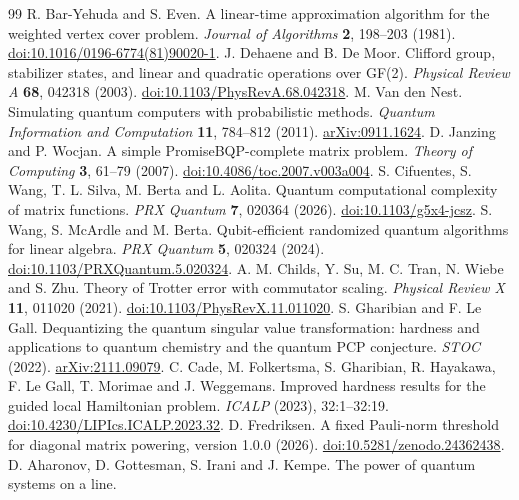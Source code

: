 \documentclass[11pt]{article}
\begin{document}
\begin{thebibliography}{99}
 R. Bar-Yehuda and S. Even. A linear-time approximation algorithm for the weighted vertex cover problem.
\emph{Journal of Algorithms} \textbf{2}, 198--203 (1981). \href{https://doi.org/10.1016/0196-6774(81)90020-1}{doi:10.1016/0196-6774(81)90020-1}.
 J. Dehaene and B. De Moor. Clifford group, stabilizer states, and linear and quadratic operations over GF(2).
\emph{Physical Review A} \textbf{68}, 042318 (2003). \href{https://doi.org/10.1103/PhysRevA.68.042318}{doi:10.1103/PhysRevA.68.042318}.
 M. Van den Nest. Simulating quantum computers with probabilistic methods.
\emph{Quantum Information and Computation} \textbf{11}, 784--812 (2011). \href{https://arxiv.org/abs/0911.1624}{arXiv:0911.1624}.
 D. Janzing and P. Wocjan.
A simple PromiseBQP-complete matrix problem.
\emph{Theory of Computing} \textbf{3}, 61--79 (2007).
\href{https://doi.org/10.4086/toc.2007.v003a004}{doi:10.4086/toc.2007.v003a004}.
 S. Cifuentes, S. Wang, T. L. Silva, M. Berta and L. Aolita.
Quantum computational complexity of matrix functions.
\emph{PRX Quantum} \textbf{7}, 020364 (2026).
\href{https://doi.org/10.1103/g5x4-jcsz}{doi:10.1103/g5x4-jcsz}.
 S. Wang, S. McArdle and M. Berta.
Qubit-efficient randomized quantum algorithms for linear algebra.
\emph{PRX Quantum} \textbf{5}, 020324 (2024).
\href{https://doi.org/10.1103/PRXQuantum.5.020324}{doi:10.1103/PRXQuantum.5.020324}.
 A. M. Childs, Y. Su, M. C. Tran, N. Wiebe and S. Zhu.
Theory of Trotter error with commutator scaling.
\emph{Physical Review X} \textbf{11}, 011020 (2021).
\href{https://doi.org/10.1103/PhysRevX.11.011020}{doi:10.1103/PhysRevX.11.011020}.
 S. Gharibian and F. Le Gall.
Dequantizing the quantum singular value transformation: hardness and applications to quantum chemistry and the quantum PCP conjecture.
\emph{STOC} (2022). \href{https://arxiv.org/abs/2111.09079}{arXiv:2111.09079}.
 C. Cade, M. Folkertsma, S. Gharibian, R. Hayakawa, F. Le Gall, T. Morimae and J. Weggemans.
Improved hardness results for the guided local Hamiltonian problem.
\emph{ICALP} (2023), 32:1--32:19.
\href{https://doi.org/10.4230/LIPIcs.ICALP.2023.32}{doi:10.4230/LIPIcs.ICALP.2023.32}.
 D. Fredriksen. A fixed Pauli-norm threshold for diagonal matrix powering, version 1.0.0 (2026).
\href{https://doi.org/10.5281/zenodo.24362438}{doi:10.5281/zenodo.24362438}.
 D. Aharonov, D. Gottesman, S. Irani and J. Kempe.
The power of quantum systems on a line.

\end{thebibliography}
\end{document}
